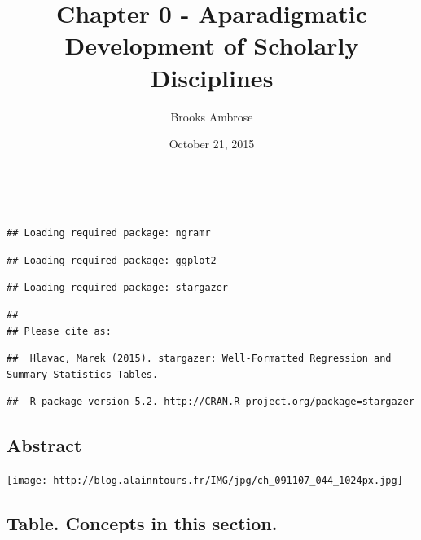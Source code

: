 \documentclass[]{article}
\title{Chapter 0 - Aparadigmatic Development of Scholarly Disciplines}
\author{Brooks Ambrose}
\date{October 21, 2015}
\begin{document}
\maketitle


{
\hypersetup{linkcolor=black}
\setcounter{tocdepth}{2}
\tableofcontents
}


\begin{verbatim}
## Loading required package: ngramr
\end{verbatim}

\begin{verbatim}
## Loading required package: ggplot2
\end{verbatim}

\begin{verbatim}
## Loading required package: stargazer
\end{verbatim}

\begin{verbatim}
## 
## Please cite as:
\end{verbatim}

\begin{verbatim}
##  Hlavac, Marek (2015). stargazer: Well-Formatted Regression and Summary Statistics Tables.
\end{verbatim}

\begin{verbatim}
##  R package version 5.2. http://CRAN.R-project.org/package=stargazer
\end{verbatim}

\subsection{Abstract}\label{abstract}

\texttt{[image: http://blog.alainntours.fr/IMG/jpg/ch\_091107\_044\_1024px.jpg]}

\subsection{Table. Concepts in this
section.}\label{table.-concepts-in-this-section.}
\end{document}
